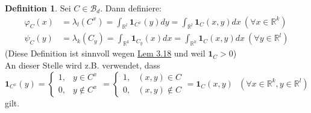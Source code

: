 \documentclass[a4paper]{report}
\newcommand{\doubleOne}{\textbf{1}}
\newcommand{\R}{\mathbb{R}}
\newcommand{\Borel}{\mathcal{B}}
\newcommand{\Bd}{\Borel_d}
\newcommand{\jlabel}[1]{\label{j_#1}}
\newcommand{\jhyperref}[2]{\hyperref[j_#1]{#2}}
\newcommand{\jlink}[1]{\jhyperref{#1}{#1}}
\theoremstyle{plain}
\theoremstyle{definition}
\newtheorem*{defn*}{Definition}
\begin{document}
{{{{\begin{defn*}
    Sei $C\in \Bd$. Dann definiere:
    \jlabel{(3.4)}
    \begin{equation}
        \begin{split}
            \varphi_C(x) &= \lambda_l(C^x) = \int_{\R^l} \doubleOne_{C^x}(y) dy = \int_{\R^l} \doubleOne_C (x,y) dx \ (\forall x\in \R^k)\\
            \psi_C(y) &= \lambda_k(C_y) = \int_{\R^k} \doubleOne_{C_y} (x) dx = \int_{\R^k} \doubleOne_C(x,y)dx \ (\forall y \in \R^l)
        \end{split}
    \end{equation}
    (Diese Definition ist sinnvoll wegen \jlink{Lem 3.18} und weil $\doubleOne_{C} > 0$)\\
    An dieser Stelle wird z.B. verwendet, dass
    \begin{displaymath}
        \doubleOne_{C^x}(y) = \begin{cases} 1, &y\in C^x\\ 0, &y\notin C^x \end{cases} = \begin{cases} 1, &(x,y)\in C\\ 0, &(x,y)\notin C \end{cases} = \doubleOne_C(x,y) \ \ \ (\forall x\in\R^k, y\in\R^l)
    \end{displaymath}
    gilt.
\end{defn*}

}}}}
\end{document}

